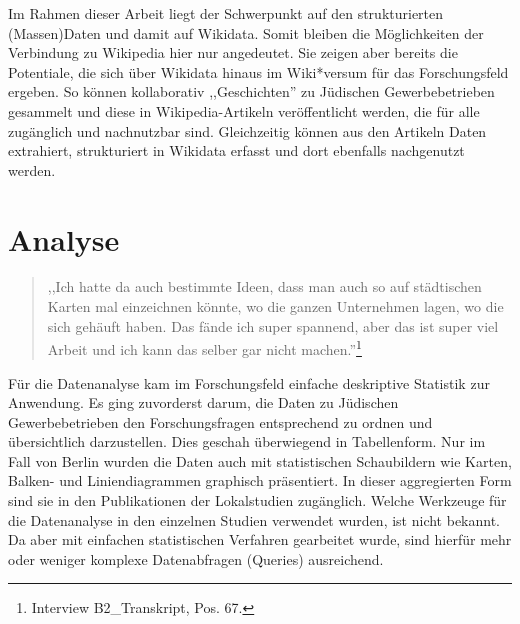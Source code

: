 Im Rahmen dieser Arbeit liegt der Schwerpunkt auf den strukturierten (Massen)Daten und damit auf Wikidata. Somit bleiben die Möglichkeiten der Verbindung zu Wikipedia hier nur angedeutet. Sie zeigen aber bereits die Potentiale, die sich über Wikidata hinaus im Wiki*versum für das Forschungsfeld ergeben. So können kollaborativ ,,Geschichten'' zu Jüdischen Gewerbebetrieben gesammelt und diese in Wikipedia-Artikeln veröffentlicht werden, die für alle zugänglich und nachnutzbar sind. Gleichzeitig können aus den Artikeln Daten extrahiert, strukturiert in Wikidata erfasst und dort ebenfalls nachgenutzt werden.

\section{Analyse}

\begin{quote}
    ,,Ich hatte da auch bestimmte Ideen, dass man auch so auf städtischen Karten mal einzeichnen könnte, wo die ganzen Unternehmen lagen, wo die sich gehäuft haben. Das fände ich super spannend, aber das ist super viel Arbeit und ich kann das selber gar nicht machen.''\footnote{Interview B2\_Transkript, Pos. 67.}
\end{quote}

Für die Datenanalyse kam im Forschungsfeld einfache deskriptive Statistik zur Anwendung. Es ging zuvorderst darum, die Daten zu Jüdischen Gewerbebetrieben den Forschungsfragen entsprechend zu ordnen und übersichtlich darzustellen. Dies geschah überwiegend in Tabellenform. Nur im Fall von Berlin wurden die Daten auch mit statistischen Schaubildern wie Karten, Balken- und Liniendiagrammen graphisch präsentiert. In dieser aggregierten Form sind sie in den Publikationen der Lokalstudien zugänglich. Welche Werkzeuge für die Datenanalyse in den einzelnen Studien verwendet wurden, ist nicht bekannt. Da aber mit einfachen statistischen Verfahren gearbeitet wurde, sind hierfür mehr oder weniger komplexe Datenabfragen (Queries) ausreichend. 

